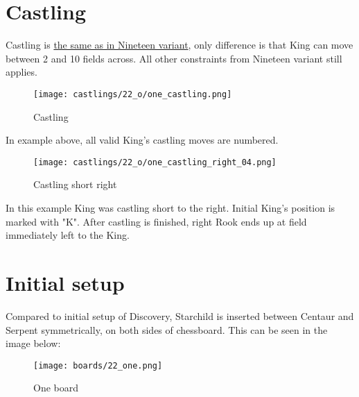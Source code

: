 \section*{Castling}
\label{sec:One/Castling}

Castling is
\hyperref[sec:Nineteen/Castling]{the same as in Nineteen variant},
only difference is that King can move
between 2 and 10 fields across. All other constraints from Nineteen variant still
applies.

\noindent
\begin{figure}[!h]
\texttt{[image: castlings/22\_o/one\_castling.png]}
\caption{Castling}
\label{fig:one_castling}
\end{figure}

In example above, all valid King's castling moves are numbered.

\noindent
\begin{figure}[!h]
\texttt{[image: castlings/22\_o/one\_castling\_right\_04.png]}
\caption{Castling short right}
\label{fig:one_castling_right_04}
\end{figure}

In this example King was castling short to the right. Initial King's position is
marked with "K". After castling is finished, right Rook ends up at field immediately
left to the King.

\clearpage %

\section*{Initial setup}
\label{sec:One/Initial setup}

Compared to initial setup of Discovery, Starchild is inserted between Centaur and
Serpent symmetrically, on both sides of chessboard. This can be seen in the image
below:

\noindent
\begin{figure}[h]
\texttt{[image: boards/22\_one.png]}
\caption{One board}
\label{fig:22_one}
\end{figure}

\clearpage %
